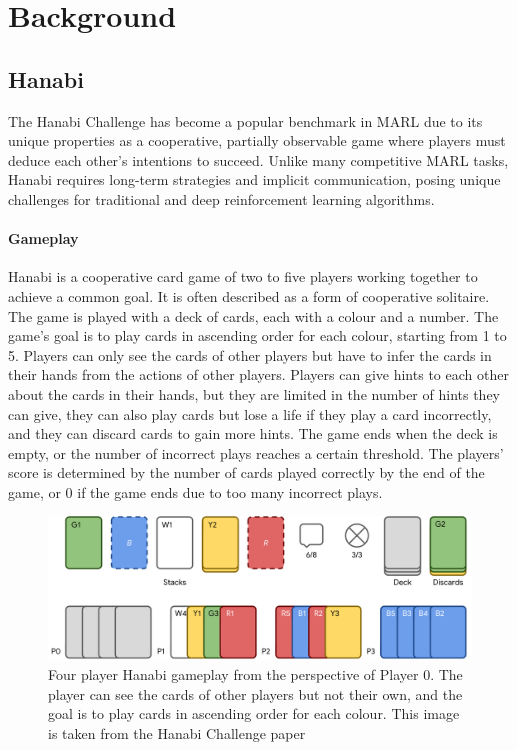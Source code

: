 \section{Background}
\subsection{Hanabi}

The Hanabi Challenge has become a popular benchmark in MARL due to its unique properties as a cooperative, partially observable game where players must deduce each other's intentions to succeed. Unlike many competitive MARL tasks, Hanabi requires long-term strategies and implicit communication, posing unique challenges for traditional and deep reinforcement learning algorithms.
\paragraph*{Gameplay}
Hanabi is a cooperative card game of two to five players working together to achieve a common goal. It is often described as a form of cooperative solitaire. The game is played with a deck of cards, each with a colour and a number. The game's goal is to play cards in ascending order for each colour, starting from 1 to 5. Players can only see the cards of other players but have to infer the cards in their hands from the actions of other players. Players can give hints to each other about the cards in their hands, but they are limited in the number of hints they can give, they can also play cards but lose a life if they play a card incorrectly, and they can discard cards to gain more hints.
The game ends when the deck is empty, or the number of incorrect plays reaches a certain threshold. The players' score is determined by the number of cards played correctly by the end of the game, or 0 if the game ends due to too many incorrect plays.

\begin{figure}[h]
    \centering
    \includegraphics[width=\linewidth]{images/Hanabi.png}
    \caption{
      Four player Hanabi gameplay from the perspective of Player 0. The player can see the cards of other players but not their own, and the goal is to play cards in ascending order for each colour. This image is taken from the Hanabi Challenge paper \cite{bardHanabiChallengeNew2020a}
    }
  \end{figure}


